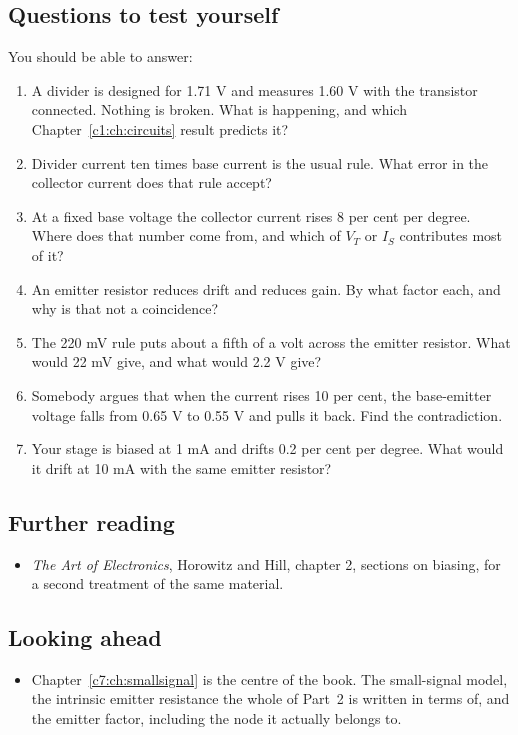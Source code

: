 \subsection*{Questions to test yourself}
You should be able to answer:
\begin{enumerate}
  \item A divider is designed for 1.71 V and measures 1.60 V with the transistor connected. Nothing is broken. What is happening, and which Chapter~\ref{c1:ch:circuits} result predicts it?
  \item Divider current ten times base current is the usual rule. What error in the collector current does that rule accept?
  \item At a fixed base voltage the collector current rises 8 per cent per degree. Where does that number come from, and which of $V_T$ or $I_S$ contributes most of it?
  \item An emitter resistor reduces drift and reduces gain. By what factor each, and why is that not a coincidence?
  \item The 220 mV rule puts about a fifth of a volt across the emitter resistor. What would 22 mV give, and what would 2.2 V give?
  \item Somebody argues that when the current rises 10 per cent, the base-emitter voltage falls from 0.65 V to 0.55 V and pulls it back. Find the contradiction.
  \item Your stage is biased at 1 mA and drifts 0.2 per cent per degree. What would it drift at 10 mA with the same emitter resistor?
\end{enumerate}

\subsection*{Further reading}
\begin{itemize}
  \item \emph{The Art of Electronics}, Horowitz and Hill, chapter 2, sections on biasing, for a second treatment of the same material.
\end{itemize}

\subsection*{Looking ahead}
\begin{itemize}
  \item Chapter~\ref{c7:ch:smallsignal} is the centre of the book. The small-signal model, the intrinsic emitter resistance the whole of Part~2 is written in terms of, and the emitter factor, including the node it actually belongs to.
\end{itemize}
